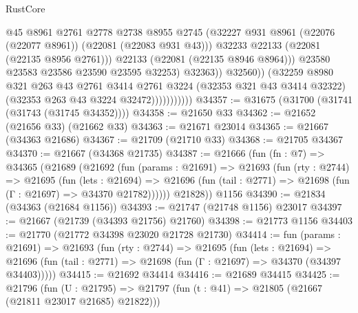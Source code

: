 \begin{lexlean}{RustCore}
\begin{coremodule}
                                    @45
                                    @8961
                                    @2761
                                    @2778
                                    @2738
                                    @8955
                                    @2745
                                    (@32227
                                      @931
                                      @8961
                                      (@22076 (@22077 @8961))
                                      (@22081 (@22083 @931 @43)))
                                    @32233
                                    @22133
                                    (@22081 (@22135 @8956 @2761)))
                                  @22133
                                  (@22081 (@22135 @8946 @8964)))
                                @23580
                                @23583
                                @23586
                                @23590
                                @23595
                                @32253)
                              @32363))
                          @32560))
                      (@32259
                        @8980
                        @321
                        @263
                        @43
                        @2761
                        @3414
                        @2761
                        @3224
                        (@32353 @321 @43 @3414 @32322)
                        (@32353 @263 @43 @3224 @32472)))))))))))
@34357 := @31675 (@31700 (@31741 (@31743 (@31745 @34352))))
@34358 := @21650 @33
@34362 := @21652 (@21656 @33) (@21662 @33)
@34363 := @21671 @23014
@34365 := @21667 (@34363 @21686)
@34367 := @21709 (@21710 @33)
@34368 := @21705 @34367
@34370 := @21667 (@34368 @21735)
@34387 := @21666
    (fun (fn : @7) =>
    @34365
      (@21689
        (@21692
          (fun (params : @21691) =>
          @21693
            (fun (rty : @2744) =>
            @21695
              (fun (lets : @21694) =>
              @21696 (fun (tail : @2771) => @21698 (fun (Γ : @21697) => @34370 @21782))))))
        @21828))
    @1156
@34390 := @21834 (@34363 (@21684 @1156))
@34393 := @21747 (@21748 @1156) @23017
@34397 := @21667 (@21739 (@34393 @21756) @21760)
@34398 := @21773 @1156
@34403 := @21770 (@21772 @34398 @23020 @21728 @21730)
@34414 := fun (params : @21691) =>
  @21693
    (fun (rty : @2744) =>
    @21695
      (fun (lets : @21694) =>
      @21696 (fun (tail : @2771) => @21698 (fun (Γ : @21697) => @34370 (@34397 @34403)))))
@34415 := @21692 @34414
@34416 := @21689 @34415
@34425 := @21796
    (fun (U : @21795) => @21797 (fun (t : @41) => @21805 (@21667 (@21811 @23017 @21685) @21822)))

\end{coremodule}
\end{lexlean}

